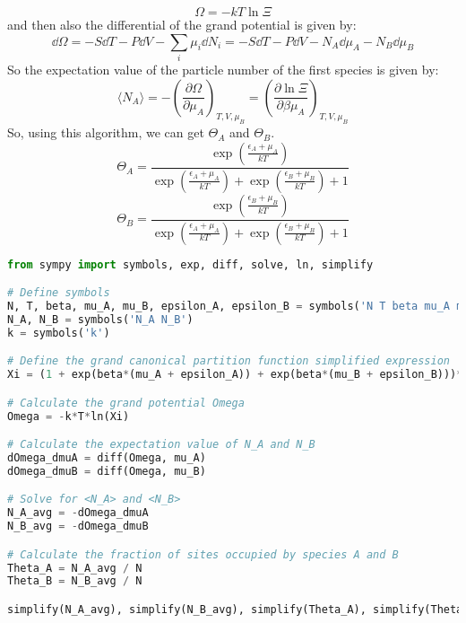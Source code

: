 \documentclass[12pt]{article}
\begin{document}
\begin{enumerate}
\begin{equation}
\Omega = -kT \ln \Xi
\end{equation}
and then also the differential of the grand potential is given by:
\begin{equation}
\dd{\Omega} = -S \dd{T} - P \dd{V} - \sum_i \mu_i \dd{N_i} = -S \dd{T} - P \dd{V} - N_A \dd{\mu_A} - N_B \dd{\mu_B}
\end{equation}
So the expectation value of the particle number of the first species is given by:
\begin{equation}
\langle N_A \rangle = -\left(\frac{\partial \Omega}{\partial \mu_A}\right)_{T, V, \mu_B} = \left( \frac{\partial \ln \Xi}{\partial \beta \mu_A}\right)_{T, V, \mu_B}
\end{equation}
So, using this algorithm, we can get $\Theta _{A}$ and $\Theta _{B}$.
\begin{equation}
\Theta_A=\frac{\exp \left(\frac{\epsilon_A+\mu_A}{k T}\right)}{\exp \left(\frac{\epsilon_A+\mu_A}{k T}\right)+\exp \left(\frac{\epsilon_B+\mu_B}{k T}\right)+1}
\end{equation}
\begin{equation}
\Theta_B=\frac{\exp \left(\frac{\epsilon_B+\mu_B}{k T}\right)}{\exp \left(\frac{\epsilon_A+\mu_A}{k T}\right)+\exp \left(\frac{\epsilon_B+\mu_B}{k T}\right)+1}
\end{equation}
\begin{lstlisting}[language=Python]
from sympy import symbols, exp, diff, solve, ln, simplify

# Define symbols
N, T, beta, mu_A, mu_B, epsilon_A, epsilon_B = symbols('N T beta mu_A mu_B epsilon_A epsilon_B')
N_A, N_B = symbols('N_A N_B')
k = symbols('k')

# Define the grand canonical partition function simplified expression
Xi = (1 + exp(beta*(mu_A + epsilon_A)) + exp(beta*(mu_B + epsilon_B)))**N

# Calculate the grand potential Omega
Omega = -k*T*ln(Xi)

# Calculate the expectation value of N_A and N_B
dOmega_dmuA = diff(Omega, mu_A)
dOmega_dmuB = diff(Omega, mu_B)

# Solve for <N_A> and <N_B>
N_A_avg = -dOmega_dmuA
N_B_avg = -dOmega_dmuB

# Calculate the fraction of sites occupied by species A and B
Theta_A = N_A_avg / N
Theta_B = N_B_avg / N

simplify(N_A_avg), simplify(N_B_avg), simplify(Theta_A), simplify(Theta_B)


\end{lstlisting}
\end{enumerate}
\end{document}
